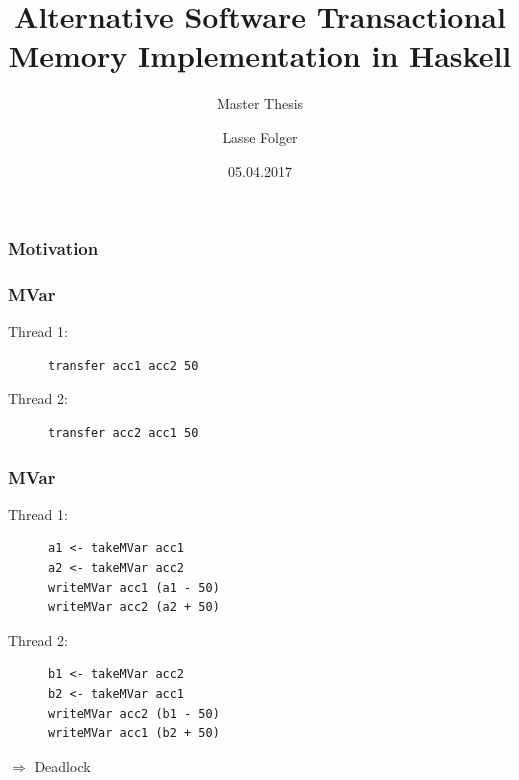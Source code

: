\documentclass{beamer}
\author{Lasse Folger}
\title{\huge Alternative Software Transactional Memory Implementation in Haskell}
\subtitle{Master Thesis}
\date{05.04.2017}
\begin{document}
  \begin{frame}[t,plain]
    \titlepage
  \end{frame}
  
  
  \begin{frame}
    \frametitle{Motivation}
    
  \end{frame}
  
  \begin{frame}[fragile]
    \frametitle{MVar}
    \fboxsep=0pt
    \noindent
    \begin{minipage}[t]{0.48\linewidth}
      Thread 1:
            \begin{figure}
       \begin{lstlisting}[frame=single]
transfer acc1 acc2 50
       \end{lstlisting}
      \end{figure}
\end{minipage}%
    \hfill%
    \begin{minipage}[t]{0.48\linewidth}
      Thread 2:      
      \begin{figure}
       \begin{lstlisting}[frame=single]
transfer acc2 acc1 50
       \end{lstlisting}
      \end{figure}
    \end{minipage}
\end{frame}

  \begin{frame}[fragile]
    \frametitle{MVar}
    \fboxsep=0pt
    \noindent
    \begin{minipage}[t]{0.48\linewidth}
      Thread 1:
            \begin{figure}
       \begin{lstlisting}[frame=single]
a1 <- takeMVar acc1 
a2 <- takeMVar acc2 
writeMVar acc1 (a1 - 50)
writeMVar acc2 (a2 + 50)
       \end{lstlisting}
      \end{figure}
\end{minipage}%
    \hfill%
    \begin{minipage}[t]{0.48\linewidth}
      Thread 2:      
      \begin{figure}
       \begin{lstlisting}[frame=single]
b1 <- takeMVar acc2 
b2 <- takeMVar acc1 
writeMVar acc2 (b1 - 50)
writeMVar acc1 (b2 + 50)
       \end{lstlisting}
      \end{figure}
    \end{minipage}
    \vfill
    \pause
    $\Rightarrow$ Deadlock
\end{frame}
  
\end{document}
